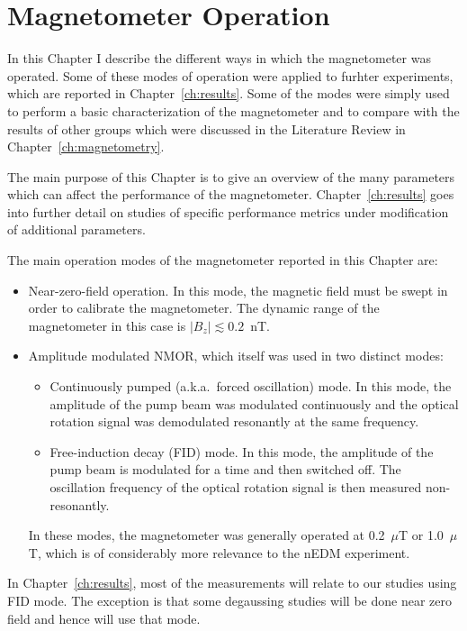 \chapter{Magnetometer Operation\label{ch:characterization}}

In this Chapter I describe the different ways in which the
magnetometer was operated.  Some of these modes of operation were
applied to furhter experiments, which are reported in
Chapter~\ref{ch:results}.  Some of the modes were simply used to
perform a basic characterization of the magnetometer and to compare
with the results of other groups which were discussed in the
Literature Review in Chapter~\ref{ch:magnetometry}.

The main purpose of this Chapter is to give an overview of the many
parameters which can affect the performance of the magnetometer.
Chapter~\ref{ch:results} goes into further detail on studies of
specific performance metrics under modification of additional
parameters.

The main operation modes of the magnetometer reported in this Chapter
are:
\begin{itemize}
\item Near-zero-field operation.  In this mode, the magnetic field
  must be swept in order to calibrate the magnetometer.  The dynamic
  range of the magnetometer in this case is $|B_z|\lesssim 0.2$~nT.
\item Amplitude modulated NMOR, which itself was used in two distinct modes:
\begin{itemize}
\item Continuously pumped (a.k.a.~forced oscillation) mode.  In this
  mode, the amplitude of the pump beam was modulated continuously and
  the optical rotation signal was demodulated resonantly at the same
  frequency.
\item Free-induction decay (FID) mode.  In this mode, the amplitude of
  the pump beam is modulated for a time and then switched off.  The
  oscillation frequency of the optical rotation signal is then
  measured non-resonantly.
\end{itemize}
In these modes, the magnetometer was generally operated at 0.2~$\mu$T
or 1.0~$\mu$T, which is of considerably more relevance to the nEDM
experiment.
\end{itemize}
In Chapter~\ref{ch:results}, most of the measurements will relate to
our studies using FID mode.  The exception is that some degaussing
studies will be done near zero field and hence will use that mode.


